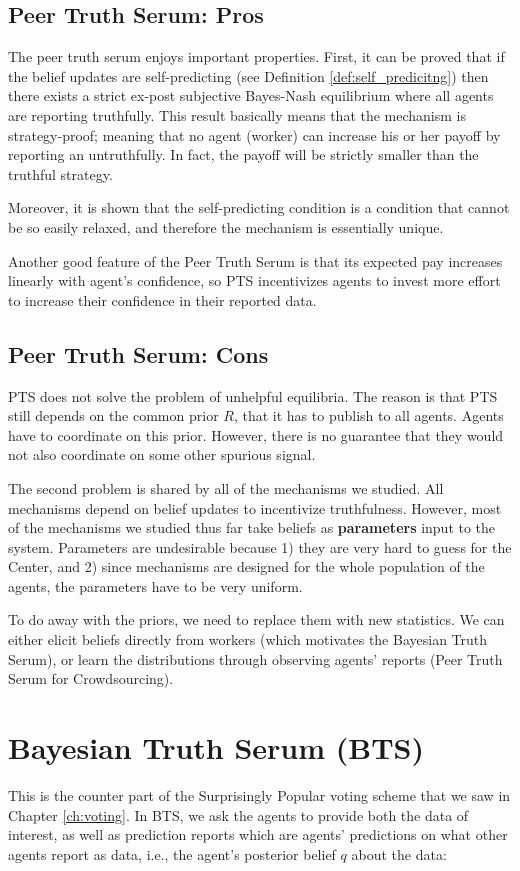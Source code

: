 \documentclass{report}
\theoremstyle{definition}
\begin{document}
\subsection{Peer Truth Serum: Pros}
The peer truth serum enjoys important properties. First, it can be proved that if the belief updates are self-predicting (see Definition \ref{def:self_predicitng}) then there exists a strict ex-post subjective Bayes-Nash equilibrium where all agents are reporting truthfully. This result basically means that the mechanism is strategy-proof; meaning that no agent (worker) can increase his or her payoff by reporting an untruthfully. In fact, the payoff will be strictly smaller than the truthful strategy.

Moreover, it is shown that the self-predicting condition is a condition that cannot be so easily relaxed, and therefore the mechanism is essentially unique.~\cite{faltings:book}

Another good feature of the Peer Truth Serum is that its expected pay increases linearly with agent's confidence, so PTS incentivizes agents to invest more effort to increase their confidence in their reported data.

\subsection{Peer Truth Serum: Cons}
PTS does not solve the problem of unhelpful equilibria. The reason is that PTS still depends on the common prior $R$, that it has to publish to all agents. Agents have to coordinate on this prior. However, there is no guarantee that they would not also coordinate on some other spurious signal.

The second problem is shared by all of the mechanisms we studied. All mechanisms depend on belief updates to incentivize truthfulness. However, most of the mechanisms we studied thus far take beliefs as \textbf{parameters} input to the system. Parameters are undesirable because 1) they are very hard to guess for the Center, and 2) since mechanisms are designed for the whole population of the agents, the parameters have to be very uniform.

To do away with the priors, we need to replace them with new statistics. We can either elicit beliefs directly from workers (which motivates the Bayesian Truth Serum), or learn the distributions through observing agents' reports (Peer Truth Serum for Crowdsourcing).

\section{Bayesian Truth Serum (BTS)}
This is the counter part of the Surprisingly Popular voting scheme that we saw in Chapter \ref{ch:voting}. In BTS, we ask the agents to provide both the data of interest, as well as prediction reports which are agents' predictions on what other agents report as data, i.e.,  the agent’s posterior belief $q$ about the data:
\end{document}
